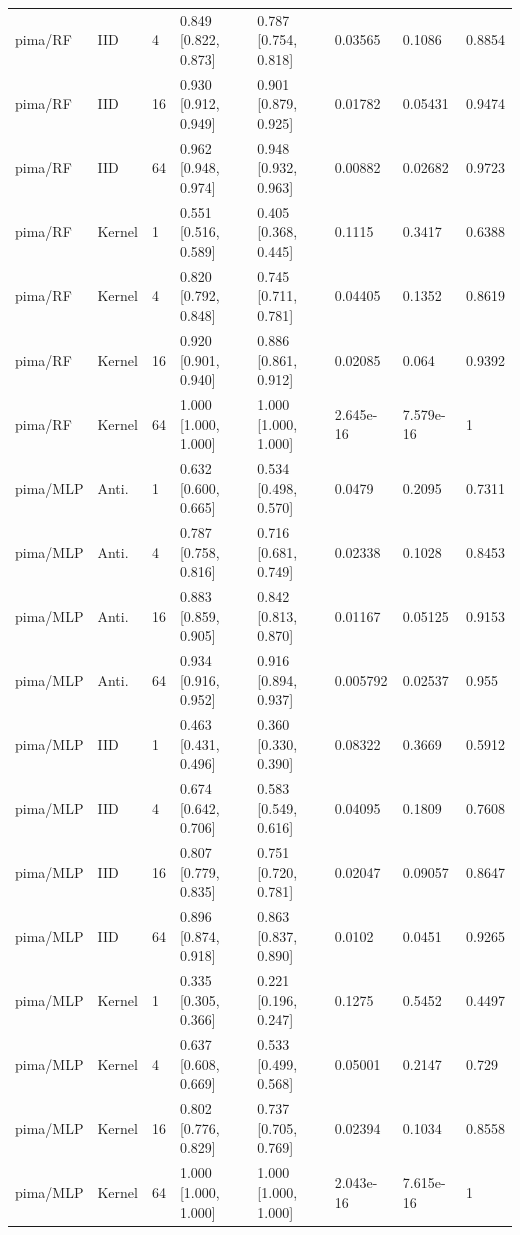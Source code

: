 \begin{tabular}{llllllll}
pima/RF & IID & 4 & 0.849 [0.822, 0.873] & 0.787 [0.754, 0.818] & 0.03565 & 0.1086 & 0.8854 \\
pima/RF & IID & 16 & 0.930 [0.912, 0.949] & 0.901 [0.879, 0.925] & 0.01782 & 0.05431 & 0.9474 \\
pima/RF & IID & 64 & 0.962 [0.948, 0.974] & 0.948 [0.932, 0.963] & 0.00882 & 0.02682 & 0.9723 \\
pima/RF & Kernel & 1 & 0.551 [0.516, 0.589] & 0.405 [0.368, 0.445] & 0.1115 & 0.3417 & 0.6388 \\
pima/RF & Kernel & 4 & 0.820 [0.792, 0.848] & 0.745 [0.711, 0.781] & 0.04405 & 0.1352 & 0.8619 \\
pima/RF & Kernel & 16 & 0.920 [0.901, 0.940] & 0.886 [0.861, 0.912] & 0.02085 & 0.064 & 0.9392 \\
pima/RF & Kernel & 64 & 1.000 [1.000, 1.000] & 1.000 [1.000, 1.000] & 2.645e-16 & 7.579e-16 & 1 \\
pima/MLP & Anti. & 1 & 0.632 [0.600, 0.665] & 0.534 [0.498, 0.570] & 0.0479 & 0.2095 & 0.7311 \\
pima/MLP & Anti. & 4 & 0.787 [0.758, 0.816] & 0.716 [0.681, 0.749] & 0.02338 & 0.1028 & 0.8453 \\
pima/MLP & Anti. & 16 & 0.883 [0.859, 0.905] & 0.842 [0.813, 0.870] & 0.01167 & 0.05125 & 0.9153 \\
pima/MLP & Anti. & 64 & 0.934 [0.916, 0.952] & 0.916 [0.894, 0.937] & 0.005792 & 0.02537 & 0.955 \\
pima/MLP & IID & 1 & 0.463 [0.431, 0.496] & 0.360 [0.330, 0.390] & 0.08322 & 0.3669 & 0.5912 \\
pima/MLP & IID & 4 & 0.674 [0.642, 0.706] & 0.583 [0.549, 0.616] & 0.04095 & 0.1809 & 0.7608 \\
pima/MLP & IID & 16 & 0.807 [0.779, 0.835] & 0.751 [0.720, 0.781] & 0.02047 & 0.09057 & 0.8647 \\
pima/MLP & IID & 64 & 0.896 [0.874, 0.918] & 0.863 [0.837, 0.890] & 0.0102 & 0.0451 & 0.9265 \\
pima/MLP & Kernel & 1 & 0.335 [0.305, 0.366] & 0.221 [0.196, 0.247] & 0.1275 & 0.5452 & 0.4497 \\
pima/MLP & Kernel & 4 & 0.637 [0.608, 0.669] & 0.533 [0.499, 0.568] & 0.05001 & 0.2147 & 0.729 \\
pima/MLP & Kernel & 16 & 0.802 [0.776, 0.829] & 0.737 [0.705, 0.769] & 0.02394 & 0.1034 & 0.8558 \\
pima/MLP & Kernel & 64 & 1.000 [1.000, 1.000] & 1.000 [1.000, 1.000] & 2.043e-16 & 7.615e-16 & 1 \\
\bottomrule
\end{tabular}

